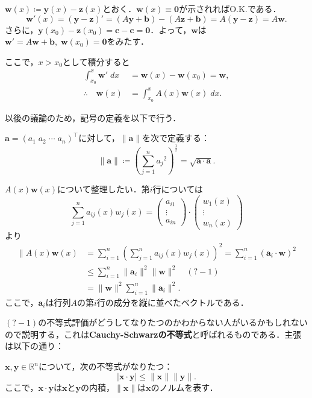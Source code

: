 $\bm{w}(x) \coloneqq \bm{y}(x) - \bm{z}(x)$とおく．$\bm{w}(x) \equiv \bm{0}$が示されればO.K.である．
\[ \bm{w}'(x) = (\bm{y}-\bm{z})' = (A\bm{y}+\bm{b})-(A\bm{z}+\bm{b}) = A(\bm{y}-\bm{z}) = A\bm{w}.\]
さらに，$\bm{y}(x_0)-\bm{z}(x_0) = \bm{c}-\bm{c}=\bm{0}$．よって，$\bm{w}$は$\bm{w}'=A\bm{w}+\bm{b}, \; \bm{w}(x_0)=\bm{0}$をみたす．

ここで，$x>x_0$として積分すると
\begin{align*}
    \int_{x_0}^{x} \bm{w}' \; dx &= \bm{w}(x) - \bm{w}(x_0) = \bm{w}, \\
    \therefore \quad \bm{w}(x) &= \int_{x_0}^{x} A(x)\bm{w}(x) \; dx.
\end{align*}

以後の議論のため，記号の定義を以下で行う．
\begin{definition}
    $\bm{a}=(a_1 \; a_2 \; \cdots \; a_n)^\top$に対して，$\|\bm{a}\|$を次で定義する：
    \[ \| \bm{a}\| \coloneqq \left(\sum_{j=1}^{n} {a_j}^2\right)^\frac{1}{2} = \sqrt{\bm{a}\cdot\bm{a}}.\]
\end{definition}

$A(x)\bm{w}(x)$について整理したい．第$i$行については
\[ \sum_{j=1}^{n} a_{ij}(x)w_j(x) = 
\begin{pmatrix}
    a_{i1} \\ \vdots \\ a_{in} 
\end{pmatrix}
\cdot
\begin{pmatrix}
    w_1(x) \\ \vdots \\ w_n(x)
\end{pmatrix}\]
より
\begin{align*}
    \| A(x)\bm{w}(x) &= \sum_{i=1}^{n} \left(\sum_{j=1}^{n} a_{ij}(x)w_j(x)\right)^2 = \sum_{i=1}^{n} (\bm{a}_i \cdot \bm{w})^2 \\
    &\leq \sum_{i=1}^{n} \|\bm{a}_i\|^2 \|\bm{w}\|^2 \quad (?-1)\\
    &= \|\bm{w}\|^2 \sum_{i=1}^{n} \| \bm{a}_i\|^2.
\end{align*}
ここで，$\bm{a}_i$は行列$A$の第$i$行の成分を縦に並べたベクトルである．

$(?-1)$の不等式評価がどうしてなりたつのかわからない人がいるかもしれないので説明する，これは\textbf{Cauchy-Schwarzの不等式}と呼ばれるものである．主張は以下の通り：
\begin{theorem}
    $\bm{x}, \bm{y} \in \mathbb{R}^n$について，次の不等式がなりたつ：
    \[ |\bm{x} \cdot \bm{y}| \leq \| \bm{x}\| \| \bm{y}\|.\]
    ここで，$\bm{x} \cdot \bm{y}$は$\bm{x}$と$\bm{y}$の内積，$\|\bm{x}\|$は$\bm{x}$のノルムを表す．
\end{theorem}

